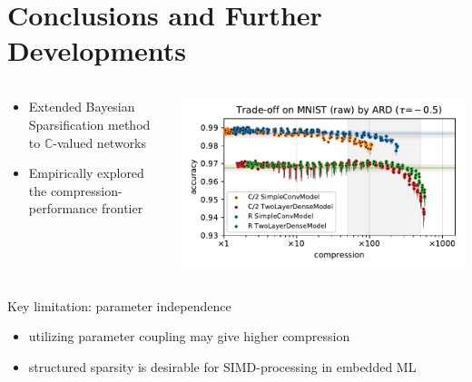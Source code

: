 \documentclass{beamer}
\newcommand{\cplx}{\mathbb{C}}
\begin{document}

\section{Conclusions and Further Developments} %
\label{sec:conclusions_and_further_developments}

\begin{frame}[c]{\insertsection}
  \begin{columns}[T]
    \begin{column}{0.38\textwidth}
      \begin{itemize}
        \item Extended Bayesian Sparsification method to $\cplx$-valued networks
        \item Empirically explored the compression-performance frontier
      \end{itemize}
    \end{column}
    \begin{column}{0.58\textwidth}
      \includegraphics[scale=0.35,clip]{figure__mnist-like__trade-off/appendix__cmp__ARD__mnist__raw__-0.5.pdf}
    \end{column}
  \end{columns}

  \bigskip
  Key limitation: parameter independence %
  \begin{itemize}
    \item utilizing parameter coupling may give higher compression
    \item structured sparsity is desirable for SIMD-processing in embedded ML
  \end{itemize}

\end{frame}
\end{document}
